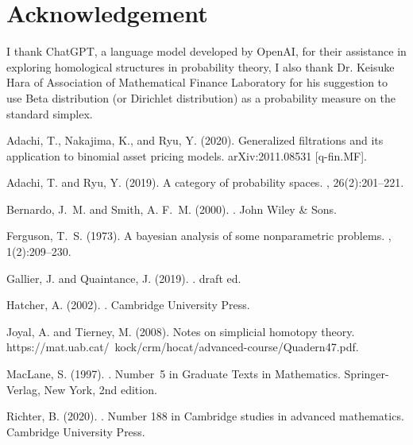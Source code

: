 \documentclass[12pt, a4paper]{amsart}
\theoremstyle{plain}
\theoremstyle{definition}
\numberwithin{figure}{section}
\numberwithin{table}{section}
\numberwithin{equation}{section}
\begin{document}


\section*{Acknowledgement}
I thank ChatGPT, a language model developed by OpenAI, 
for their assistance in exploring 
homological structures 
in probability theory,
I also thank Dr. Keisuke Hara of Association of Mathematical Finance Laboratory for his suggestion to use Beta distribution (or Dirichlet distribution) as a probability measure on the standard simplex.





\begin{thebibliography}{}

Adachi, T., Nakajima, K., and Ryu, Y. (2020).
\newblock Generalized filtrations and its application to binomial asset pricing
  models.
\newblock arXiv:2011.08531 [q-fin.MF].

Adachi, T. and Ryu, Y. (2019).
\newblock A category of probability spaces.
, 26(2):201--221.

Bernardo, J.~M. and Smith, A. F.~M. (2000).
.
\newblock John Wiley \& Sons.

Ferguson, T.~S. (1973).
\newblock A bayesian analysis of some nonparametric problems.
, 1(2):209--230.

Gallier, J. and Quaintance, J. (2019).
.
\newblock draft ed.

Hatcher, A. (2002).
.
\newblock Cambridge University Press.

Joyal, A. and Tierney, M. (2008).
\newblock Notes on simplicial homotopy theory.
\newblock https://mat.uab.cat/~kock/crm/hocat/advanced-course/Quadern47.pdf.

MacLane, S. (1997).
.
\newblock Number~5 in Graduate Texts in Mathematics. Springer-Verlag, New York,
  2nd edition.

Richter, B. (2020).
.
\newblock Number 188 in Cambridge studies in advanced mathematics. Cambridge
  University Press.

\end{thebibliography}

%
%
\end{document}
